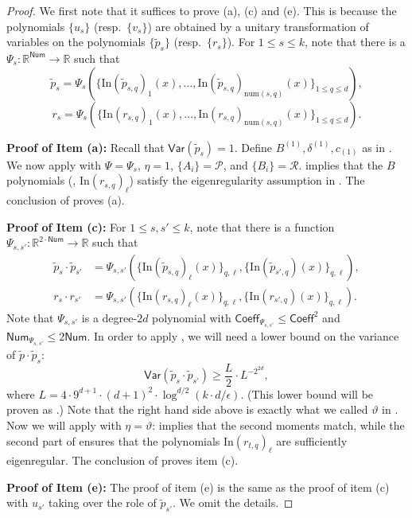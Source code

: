 \documentclass{toc}
\newcommand{\Inner}{\mathrm{In}}
\newcommand{\num}{\mathrm{num}}
\begin{document}
\begin{proof}
We first note that it suffices to prove (a), (c) and (e). This is because the polynomials $\{{u}_s\}$ (resp.\ $\{{v}_s\}$) are obtained by a unitary transformation of variables 
on the polynomials $\{\tilde{p}_s\}$ (resp.\ $\{ {r}_s\}$). For $1 \le s \le k$, note that there is a $\Psi_s: \mathbb{R}^{\mathsf{Num}} \rightarrow \mathbb{R}$
%
such that
%
\[
\tilde{p}_s = \Psi_s( \{\Inner(\tilde p_{s,q})_1(x),\dots, \Inner(\tilde p_{s,q})_{\num({s,q})}(x)\}_{ 1 \le q \le d}),
\]
\[
{r}_s = \Psi_s( \{\Inner(r_{s,q})_1(x),\dots, \Inner(r_{s,q})_{\num({s,q})}(x)\}_{ 1 \le q \le d}).
\]

\smallskip
\noindent
\textbf{Proof of Item (a):} Recall that $\mathsf{Var}(\tilde{p}_s)=1$. 
Define $B^{(1)}, \delta^{(1)}, c_{(1)}$ as in
. We now apply  with
$\Psi = \Psi_s$, $\eta=1$, $\{A_i\} = \mathcal{P}$, and $\{B_i\} =
\mathcal{R}$.  implies that the $B$ polynomials
(\ie, $\Inner(r_{s,q})_\ell$) satisfy the eigenregularity assumption
in . The conclusion of 
proves (a).

\smallskip
\noindent
\textbf{Proof of Item (c):} For $1 \le s, s' \le k$, note that there is a function $\Psi_{s,s'}: \mathbb{R}^{2 \cdot \mathsf{Num}} \rightarrow \mathbb{R}$ such that 
\begin{align*}
    \tilde{p}_s \cdot \tilde{p}_{s'} &= \Psi_{s,s'}( \{\Inner(\tilde p_{s,q})_\ell(x)\}_{q,\ell}, \{\Inner(\tilde p_{s',q})(x)\}_{q,\ell}), \\
    r_s \cdot r_{s'} &= \Psi_{s,s'}( \{\Inner(r_{s,q})_\ell(x)\}_{q,\ell}, \{\Inner(r_{s',q})(x)\}_{q,\ell}).
\end{align*}
Note that $\Psi_{s,s'}$ is a degree-$2d$ polynomial with
$\mathsf{Coeff}_{\Psi_{s,s'}} \le \mathsf{Coeff}^2$ and
$\mathsf{Num}_{\Psi_{s,s'}} \le 2 \mathsf{Num}$. In order to apply , we will need a lower bound on the variance of $\tilde p \cdot \tilde p_s$:
\[
\mathsf{Var}(\tilde{p}_s \cdot \tilde{p}_{s'}) \ge \frac{L}{2} \cdot L^{-2^{2d}},
\]
where $L = 4 \cdot 9^{d+1} \cdot (d+1)^2 \cdot \log^{d/2} (k \cdot d/\epsilon)$.
(This lower bound will be proven as .) Note
that the right hand side above is exactly what we called $\vartheta$ in
.
Now we will apply  with $\eta = \vartheta$:
implies that the second moments match, while the second part of
 ensures that the polynomials
$\Inner(r_{t,q})_\ell$ are sufficiently eigenregular.
The conclusion of  proves item (c).

\smallskip
\noindent
\textbf{Proof of Item (e):} The proof of item (e) is the same as the proof of item (c) with $u_{s'}$ taking over the role of $\tilde{p}_{s'}$. We omit the details.
\end{proof}
\end{document}
